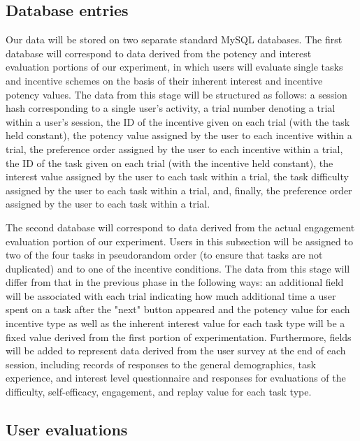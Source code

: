 \subsection{Database entries}
Our data will be stored on two separate standard MySQL databases. The first database will correspond to data derived from the potency and interest evaluation portions of our experiment, in which users will evaluate single tasks and incentive schemes on the basis of their inherent interest and incentive potency values. The data from this stage will be structured as follows: a session hash corresponding to a single user's activity, a trial number denoting a trial within a user's session, the ID of the incentive given on each trial (with the task held constant), the potency value assigned by the user to each incentive within a trial, the preference order assigned by the user to each incentive within a trial, the ID of the task given on each trial (with the incentive held constant), the interest value assigned by the user to each task within a trial, the task difficulty assigned by the user to each task within a trial, and, finally, the preference order assigned by the user to each task within a trial.

The second database will correspond to data derived from the actual engagement evaluation portion of our experiment. Users in this subsection will be assigned to two of the four tasks in pseudorandom order (to ensure that tasks are not duplicated) and to one of the incentive conditions. The data from this stage will differ from that in the previous phase in the following ways: an additional field will be associated with each trial indicating how much additional time a user spent on a task after the "next" button appeared and the potency value for each incentive type as well as the inherent interest value for each task type will be a fixed value derived from the first portion of experimentation. Furthermore, fields will be added to represent data derived from the user survey at the end of each session, including records of responses to the general demographics, task experience, and interest level questionnaire and responses for evaluations of the difficulty, self-efficacy, engagement, and replay value for each task type.
\subsection{User evaluations}